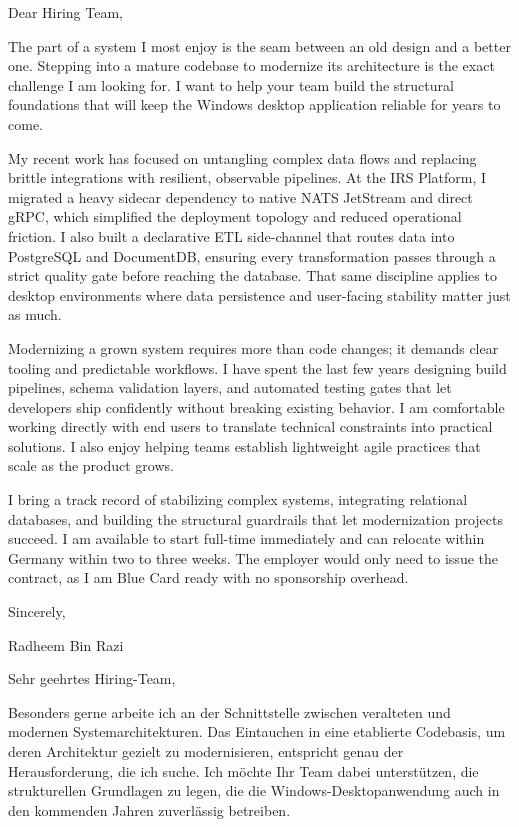 \documentclass[11pt,a4paper]{coverletter}
\begin{document}

\opening{Dear Hiring Team,}

The part of a system I most enjoy is the seam between an old design and a better one. Stepping into a mature codebase to modernize its architecture is the exact challenge I am looking for. I want to help your team build the structural foundations that will keep the Windows desktop application reliable for years to come.

My recent work has focused on untangling complex data flows and replacing brittle integrations with resilient, observable pipelines. At the IRS Platform, I migrated a heavy sidecar dependency to native NATS JetStream and direct gRPC, which simplified the deployment topology and reduced operational friction. I also built a declarative ETL side-channel that routes data into PostgreSQL and DocumentDB, ensuring every transformation passes through a strict quality gate before reaching the database. That same discipline applies to desktop environments where data persistence and user-facing stability matter just as much.

Modernizing a grown system requires more than code changes; it demands clear tooling and predictable workflows. I have spent the last few years designing build pipelines, schema validation layers, and automated testing gates that let developers ship confidently without breaking existing behavior. I am comfortable working directly with end users to translate technical constraints into practical solutions. I also enjoy helping teams establish lightweight agile practices that scale as the product grows.

I bring a track record of stabilizing complex systems, integrating relational databases, and building the structural guardrails that let modernization projects succeed. I am available to start full-time immediately and can relocate within Germany within two to three weeks. The employer would only need to issue the contract, as I am Blue Card ready with no sponsorship overhead.

\closing{Sincerely,}{Radheem Bin Razi}

\clearpage
{}


\opening{Sehr geehrtes Hiring-Team,}

Besonders gerne arbeite ich an der Schnittstelle zwischen veralteten und modernen Systemarchitekturen. Das Eintauchen in eine etablierte Codebasis, um deren Architektur gezielt zu modernisieren, entspricht genau der Herausforderung, die ich suche. Ich möchte Ihr Team dabei unterstützen, die strukturellen Grundlagen zu legen, die die Windows-Desktopanwendung auch in den kommenden Jahren zuverlässig betreiben.
\end{document}
